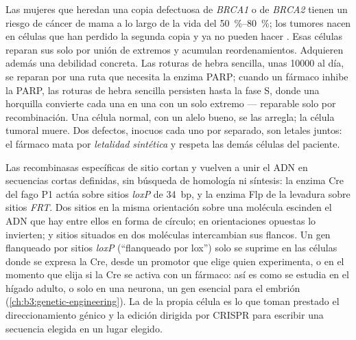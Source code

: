 \begin{example}\label{ex:b3:dna-repair:parp}
Las mujeres que heredan una copia defectuosa de \emph{BRCA1} o de
\emph{BRCA2} tienen un riesgo de cáncer de mama a lo largo de la vida del
\qtyrange{50}{80}{\%}; los tumores nacen en células que han perdido la
segunda copia y ya no pueden hacer . Esas células
reparan sus  solo por unión de extremos y acumulan
reordenamientos. Adquieren además una debilidad concreta. Las roturas de
hebra sencilla, unas \num{10000} al día, se reparan por una ruta que
necesita la enzima PARP; cuando un fármaco inhibe la PARP, las roturas de
hebra sencilla persisten hasta la fase S, donde una horquilla convierte
cada una en una  con un solo extremo --- reparable
solo por recombinación. Una célula normal, con un alelo \emph{}
bueno, se las arregla; la célula tumoral muere. Dos defectos, inocuos
cada uno por separado, son letales juntos: el fármaco mata por
\emph{letalidad sintética} y respeta las demás células del paciente.
\end{example}

\begin{proposition}\label{prop:b3:dna-repair:tools}
Las recombinasas específicas de sitio cortan y vuelven a unir el ADN en
secuencias cortas definidas, sin búsqueda de homología ni síntesis: la
enzima Cre del fago P1 actúa sobre sitios \emph{loxP} de \qty{34}{bp}, y
la enzima Flp de la levadura sobre sitios \emph{FRT}. Dos sitios en la
misma orientación sobre una molécula escinden el ADN que hay entre ellos
en forma de círculo; en orientaciones opuestas lo invierten; y sitios
situados en dos moléculas intercambian sus flancos. Un gen flanqueado por
sitios \emph{loxP} (``flanqueado por lox'') solo se suprime en las
células donde se expresa la Cre, desde un promotor que elige quien
experimenta, o en el momento que elija si la Cre se activa con un
fármaco: así es como se estudia en el hígado adulto, o solo en una
neurona, un gen esencial para el embrión
(\cref{ch:b3:genetic-engineering}). La  de la
propia célula es lo que toman prestado el direccionamiento génico y la
edición dirigida por CRISPR para escribir una secuencia elegida en un
lugar elegido.
\end{proposition}

